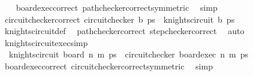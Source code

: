 \begin{isabellebody}
%
\isadelimproof
\ \ %
\endisadelimproof
%
\isatagproof
{}\isamarkupfalse%
\ board{\isacharunderscore}{\kern0pt}exec{\isacharunderscore}{\kern0pt}correct\ path{\isacharunderscore}{\kern0pt}checker{\isacharunderscore}{\kern0pt}correct{\isacharbrackleft}{\kern0pt}symmetric{\isacharbrackright}{\kern0pt}\ \isamarkupfalse%
\ simp%
\endisatagproof
{\isafoldproof}%
%
\isadelimproof
\isanewline
%
\endisadelimproof
\isanewline
{}\isamarkupfalse%
\ circuit{\isacharunderscore}{\kern0pt}checker{\isacharunderscore}{\kern0pt}correct{\isacharcolon}{\kern0pt}\ {\isachardoublequoteopen}circuit{\isacharunderscore}{\kern0pt}checker\ b\ ps\ {\isasymlongleftrightarrow}\ knights{\isacharunderscore}{\kern0pt}circuit\ b\ ps{\isachardoublequoteclose}\isanewline
%
\isadelimproof
\ \ %
\endisadelimproof
%
\isatagproof
{}\isamarkupfalse%
\ knights{\isacharunderscore}{\kern0pt}circuit{\isacharunderscore}{\kern0pt}def\ \isamarkupfalse%
\ path{\isacharunderscore}{\kern0pt}checker{\isacharunderscore}{\kern0pt}correct\ step{\isacharunderscore}{\kern0pt}checker{\isacharunderscore}{\kern0pt}correct\ \isamarkupfalse%
\ auto%
\endisatagproof
{\isafoldproof}%
%
\isadelimproof
\isanewline
%
\endisadelimproof
\isanewline
{}\isamarkupfalse%
\ knights{\isacharunderscore}{\kern0pt}circuit{\isacharunderscore}{\kern0pt}exec{\isacharunderscore}{\kern0pt}simp{\isacharcolon}{\kern0pt}\ \isanewline
\ \ {\isachardoublequoteopen}knights{\isacharunderscore}{\kern0pt}circuit\ {\isacharparenleft}{\kern0pt}board\ n\ m{\isacharparenright}{\kern0pt}\ ps\ {\isasymlongleftrightarrow}\ circuit{\isacharunderscore}{\kern0pt}checker\ {\isacharparenleft}{\kern0pt}board{\isacharunderscore}{\kern0pt}exec\ n\ m{\isacharparenright}{\kern0pt}\ ps{\isachardoublequoteclose}\isanewline
%
\isadelimproof
\ \ %
\endisadelimproof
%
\isatagproof
{}\isamarkupfalse%
\ board{\isacharunderscore}{\kern0pt}exec{\isacharunderscore}{\kern0pt}correct\ circuit{\isacharunderscore}{\kern0pt}checker{\isacharunderscore}{\kern0pt}correct{\isacharbrackleft}{\kern0pt}symmetric{\isacharbrackright}{\kern0pt}\ \isamarkupfalse%
\ simp%
\endisatagproof
{\isafoldproof}%
%
\isadelimproof
%
\endisadelimproof
%
\isadelimdocument
%
\endisadelimdocument
%
\isatagdocument
%
\isamarkuptrue%
%
\endisatagdocument
{\isafolddocument}%
%
\isadelimdocument
%
\endisadelimdocument

\end{isabellebody}
